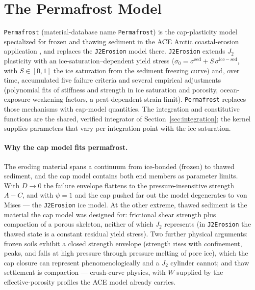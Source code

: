 \documentclass[12pt]{article}
\begin{document}
\section{The Permafrost Model}
\label{sec:permafrost}

\texttt{Permafrost} (material-database name \texttt{Permafrost}) is
the cap-plasticity model specialized for frozen and thawing sediment
in the ACE Arctic coastal-erosion application
\citep{Frederick.etal:2021}, and replaces the \texttt{J2Erosion}
model there. \texttt{J2Erosion} extends $J_2$ plasticity with an
ice-saturation--dependent yield stress
($\sigma_0 = \sigma^{\mathrm{sed}} + S\,
\sigma^{\mathrm{ice-sed}}$, with $S \in [0,1]$ the ice saturation
from the sediment freezing curve) and, over time, accumulated five
failure criteria and several empirical adjustments (polynomial fits
of stiffness and strength in ice saturation and porosity,
ocean-exposure weakening factors, a peat-dependent strain limit).
\texttt{Permafrost} replaces those mechanisms with cap-model
quantities. The integration and constitutive functions are the
shared, verified integrator of Section~\ref{sec:integration}; the
kernel supplies parameters that vary per integration point with the
ice saturation.

\paragraph{Why the cap model fits permafrost.}
The eroding material spans a continuum from ice-bonded (frozen) to
thawed sediment, and the cap model contains both end members as
parameter limits. With $D \to 0$ the failure envelope flattens to
the pressure-insensitive strength $A - C$, and with $\psi = 1$ and
the cap pushed far out the model degenerates to von Mises --- the
\texttt{J2Erosion} ice model. At the other extreme, thawed sediment
is the material the cap model was designed for: frictional shear
strength plus compaction of a porous skeleton, neither of which
$J_2$ represents (in \texttt{J2Erosion} the thawed state is a
constant residual yield stress). Two further physical arguments:
frozen soils exhibit a closed strength envelope (strength rises with
confinement, peaks, and falls at high pressure through pressure
melting of pore ice), which the cap closure can represent
phenomenologically and a $J_2$ cylinder cannot; and thaw settlement
is compaction --- crush-curve physics, with $W$ supplied by the
effective-porosity profiles the ACE model already carries.
\end{document}
